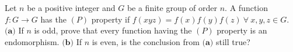 Let $n$ be a positive integer and $G$ be a finite group of order $n.$ A function $f:G \to G$ has the $(P)$ property if $f(xyz)=f(x)f(y)f(z)~\forall~x,y,z \in G.$
$\textbf{(a)}$ If $n$ is odd, prove that every function having the $(P)$ property is an endomorphism.
$\textbf{(b)}$ If $n$ is even, is the conclusion from $\textbf{(a)}$ still true?